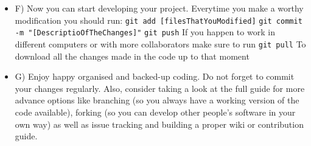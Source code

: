 \documentclass[runningheads,a4paper]{llncs}
\begin{document}
\begin{itemize}
\item F) Now you can start developing your project. Everytime you make a worthy modification you should run:
    \texttt{git add [filesThatYouModified]} \newline
    \texttt{git commit -m "[DescriptioOfTheChanges]"} \newline
    \texttt{git push}\newline
    If you happen to work in different computers or with more collaborators make sure to run \newline
    \texttt{git pull} \newline
    To download all the changes made in the code up to that moment \newline
    
    \item G) Enjoy happy organised and backed-up coding. Do not forget to commit your changes regularly. Also, consider taking a look at the full guide for more advance options like branching (so you always have a working version of the code available), forking (so you can develop other people's software in your own way) as well as issue tracking and building a proper wiki or contribution guide.
            
\end{itemize}


  





\nocite{*} 
\end{document}
